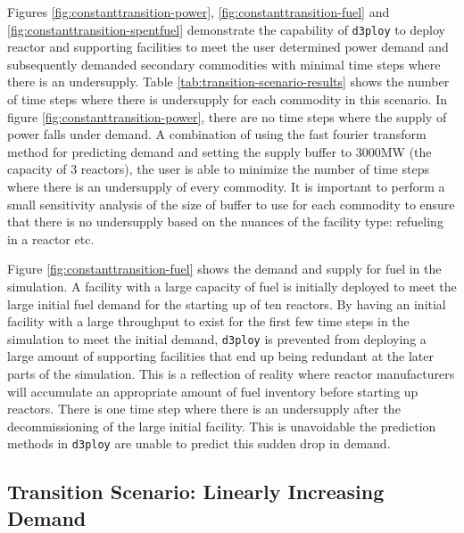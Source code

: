 \documentclass{anstrans}
\newcommand{\deploy}{\texttt{d3ploy}\xspace}%
\begin{document}
Figures \ref{fig:constanttransition-power}, \ref{fig:constanttransition-fuel}
and \ref{fig:constanttransition-spentfuel} demonstrate the capability 
of \deploy to deploy reactor and supporting facilities to meet the user 
determined power demand and subsequently demanded secondary commodities 
with minimal time steps where there is an undersupply. 
Table \ref{tab:transition-scenario-results} shows the number of time 
steps where there is undersupply for each commodity in this scenario. 
In figure \ref{fig:constanttransition-power}, there are no time steps
where the supply of power falls under demand.
A combination of using the fast fourier transform method for predicting 
demand and setting the supply buffer to 3000MW (the capacity of 3 reactors), 
the user is able to minimize the number of time steps where there 
is an undersupply of every commodity. 
It is important to perform a small sensitivity analysis of the size 
of buffer to use for each commodity to ensure that there is no 
undersupply based on the nuances of the facility type: 
refueling in a reactor etc. 

Figure \ref{fig:constanttransition-fuel} shows the demand and supply 
for fuel in the simulation. 
A facility with a large capacity of fuel is initially
deployed to meet the large initial fuel demand for the starting
up of ten reactors. 
By having an initial facility with a large throughput
to exist for the first few time steps in the simulation to meet 
the initial demand, 
\deploy is prevented from deploying a large amount of supporting
facilities that end up being redundant at the later parts of 
the simulation.   
This is a reflection of reality where reactor manufacturers will 
accumulate an appropriate amount of fuel inventory before starting 
up reactors. 
There is one time step where there is an undersupply after the 
decommissioning of the large initial facility.  
This is unavoidable the prediction methods in \deploy are unable 
to predict this sudden drop in demand. 


\subsection{\textbf{Transition Scenario: Linearly Increasing Demand}}
\end{document}
